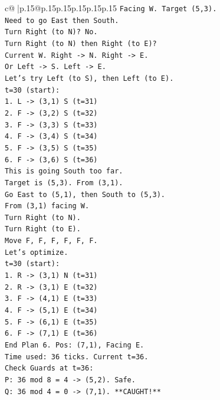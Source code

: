 \documentclass{article}
\begin{document}
{\begin{supertabular}{c@{$\;$}|p{.15\linewidth}@{}p{.15\linewidth}p{.15\linewidth}p{.15\linewidth}p{.15\linewidth}p{.15\linewidth}}
{{{\texttt{Facing W. Target (5,3).} \\
\texttt{Need to go East then South.} \\
\texttt{Turn Right (to N)? No.} \\
\texttt{Turn Right (to N) then Right (to E)?} \\
\texttt{Current W. Right {-}> N. Right {-}> E.} \\
\texttt{Or Left {-}> S. Left {-}> E.} \\
\texttt{Let's try Left (to S), then Left (to E).} \\
\texttt{t=30 (start):} \\
\texttt{1. L {-}> (3,1) S (t=31)} \\
\texttt{2. F {-}> (3,2) S (t=32)} \\
\texttt{3. F {-}> (3,3) S (t=33)} \\
\texttt{4. F {-}> (3,4) S (t=34)} \\
\texttt{5. F {-}> (3,5) S (t=35)} \\
\texttt{6. F {-}> (3,6) S (t=36)} \\
\texttt{This is going South too far.} \\
\texttt{Target is (5,3). From (3,1).} \\
\texttt{Go East to (5,1), then South to (5,3).} \\
\texttt{From (3,1) facing W.} \\
\texttt{Turn Right (to N).} \\
\texttt{Turn Right (to E).} \\
\texttt{Move F, F, F, F, F, F.} \\
\texttt{Let's optimize.} \\
\texttt{t=30 (start):} \\
\texttt{1. R {-}> (3,1) N (t=31)} \\
\texttt{2. R {-}> (3,1) E (t=32)} \\
\texttt{3. F {-}> (4,1) E (t=33)} \\
\texttt{4. F {-}> (5,1) E (t=34)} \\
\texttt{5. F {-}> (6,1) E (t=35)} \\
\texttt{6. F {-}> (7,1) E (t=36)} \\
\texttt{End Plan 6. Pos: (7,1), Facing E.} \\
\texttt{Time used: 36 ticks. Current t=36.} \\
\texttt{Check Guards at t=36:} \\
\texttt{P: 36 mod 8 = 4 {-}> (5,2). Safe.} \\
\texttt{Q: 36 mod 4 = 0 {-}> (7,1). **CAUGHT!**} \\
}}}
\end{supertabular}}
\end{document}
